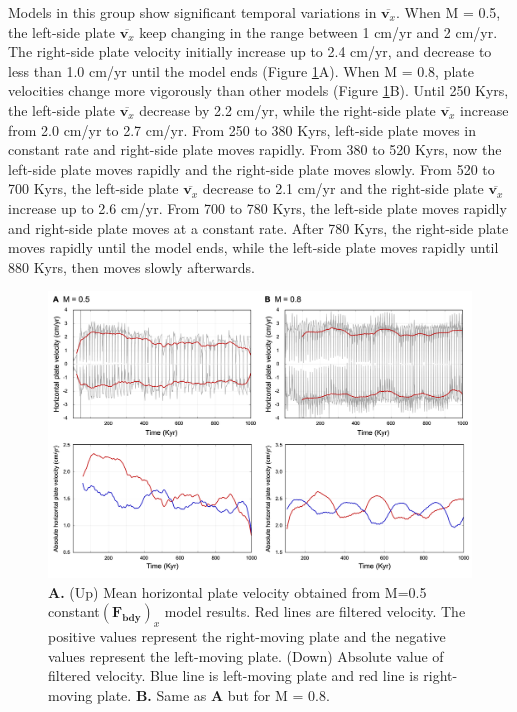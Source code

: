 \documentclass[letterpaper,12pt,notitle]{memphisthesis}                     %
\begin{document}
Models in this group show significant temporal variations in $\overline{\boldsymbol{v}_x}$. 
When M = 0.5, the left-side plate $\overline{\boldsymbol{v}_x}$ keep changing in the range between 1 cm/yr and 2 cm/yr. The right-side plate velocity initially increase up to 2.4 cm/yr, and decrease to less than 1.0 cm/yr until the model ends (Figure \ref{fig:fbmhv}A).
When M = 0.8, plate velocities change more vigorously than other models (Figure \ref{fig:fbmhv}B). Until 250 Kyrs, the left-side plate $\overline{\boldsymbol{v}_x}$ decrease by 2.2 cm/yr, while the right-side plate  $\overline{\boldsymbol{v}_x}$ increase from 2.0 cm/yr to 2.7 cm/yr. From 250 to 380 Kyrs, left-side plate moves in constant rate and right-side plate moves rapidly. From 380 to 520 Kyrs, now the left-side plate moves rapidly and the right-side plate moves slowly. From 520 to 700 Kyrs, the left-side plate $\overline{\boldsymbol{v}_x}$ decrease to 2.1 cm/yr and the right-side plate $\overline{\boldsymbol{v}_x}$ increase up to 2.6 cm/yr. From 700 to 780 Kyrs, the left-side plate moves rapidly and right-side plate moves at a constant rate. After 780 Kyrs, the right-side plate moves rapidly until the model ends, while the left-side plate moves rapidly until 880 Kyrs, then moves slowly afterwards.
%
\begin{figure}[!htb]
	\centering
	\includegraphics[width=0.98\linewidth,trim=4 4 4 4,clip]{./figs/fbmhv.png}
	\caption{\textbf{A.} (Up) Mean horizontal plate velocity obtained from M=0.5 constant$(\boldsymbol{F_{bdy}})_x$ model results. Red lines are filtered velocity. The positive values represent the right-moving plate and the negative values represent the left-moving plate. (Down) Absolute value of filtered velocity. Blue line is left-moving plate and red line is right-moving plate. \textbf{B.} Same as \textbf{A} but for M = 0.8.}
	\label{fig:fbmhv}
\end{figure}
\end{document}
